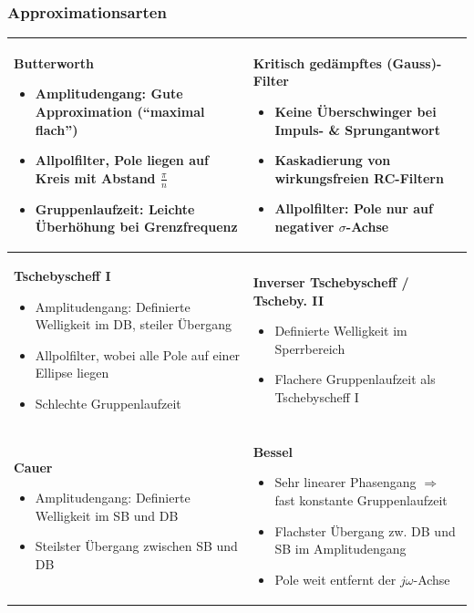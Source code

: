 \subsubsection{Approximationsarten }
\begin{tabular}{|p{9cm}|p{9cm}|}
\hline
\parbox{9cm}{
	\textbf{Butterworth} 
	\begin{itemize}
	 \item Amplitudengang: Gute Approximation (``maximal flach'')
	 \item Allpolfilter, Pole liegen auf Kreis mit Abstand
	 $\frac{\pi}{n}$
	 \item Gruppenlaufzeit: Leichte Überhöhung bei
	 Grenzfrequenz
	\end{itemize}
	}
& 
\parbox{9cm}{
	\textbf{Kritisch gedämpftes (Gauss)-Filter} 
	\begin{itemize}
	 \item Keine Überschwinger bei Impuls- \& Sprungantwort
	 \item Kaskadierung von wirkungsfreien RC-Filtern
	 \item Allpolfilter: Pole nur auf negativer $\sigma$-Achse
	\end{itemize}
	} \\
\hline
\parbox{9cm}{
	\textbf{Tschebyscheff I} 
	\begin{itemize}
	 \item Amplitudengang: Definierte Welligkeit im DB, steiler Übergang
	 \item Allpolfilter, wobei alle Pole auf einer Ellipse liegen
	 \item Schlechte Gruppenlaufzeit
	\end{itemize}
	}
&
 \parbox{9cm}{
	\textbf{Inverser Tschebyscheff  / Tscheby. II} 
	\begin{itemize}
	 \item Definierte Welligkeit im Sperrbereich
	 \item Flachere Gruppenlaufzeit als Tschebyscheff I
	\end{itemize}
	} \\
\hline
\parbox{6cm}{
	\textbf{Cauer} 
	\begin{itemize}
	 \item Amplitudengang: Definierte Welligkeit im SB und DB
	 \item Steilster Übergang zwischen SB und DB
	\end{itemize}
	}
& 
\parbox{6cm}{
	\textbf{Bessel} 
	\begin{itemize}
	 \item Sehr linearer Phasengang $\Rightarrow$ fast konstante Gruppenlaufzeit
	 \item Flachster Übergang zw. DB und SB im Amplitudengang
	 \item Pole weit entfernt der $j \omega$-Achse
	\end{itemize}
	} \\
\hline
\end{tabular}

